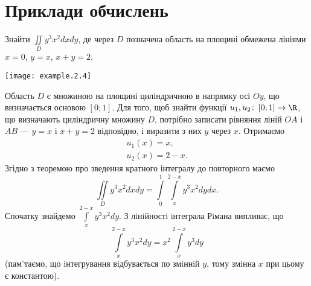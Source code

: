 \chapter{Приклади обчислень}
\begin{example}
Знайти ${\iint\limits_D y^3 x^2 d x d y}$, де через $D$ позначена область на площині обмежена лініями ${x = 0}$, ${y = x}$, ${x + y = 2}$.

\texttt{[image: example.2.4]}

Область $D$ є множиною на площині циліндричною в напрямку осі ${Oy}$, що визначається основою ${\left[0;1\right]}$. Для того, щоб знайти функції ${u_1, u_2\colon \left[0;1\right]\to \R}$, що визначають циліндричну множину $D$, потрібно записати рівняння ліній ${OA}$ і ${AB}$ --- ${y = x}$ і ${x + y =2 }$ відповідно, і виразити з них $y$ через $x$. Отримаємо
\[
\begin{array}{l}
u_1(x) = x,\\ u_2(x) = 2 - x.
\end{array}
\]
Згідно з теоремою про зведення кратного інтегралу до повторного маємо
\[
\iint\limits_D y^3 x^2 d x d y = \int\limits_0^1 \int\limits_{x}^{2 - x} y^3 x^2 d y d x.
\]
Спочатку знайдемо ${\int\limits_{x}^{2 - x} y^3 x^2 d y}$. З лiнiйностi iнтеграла Рiмана випливає, що
\[
\int\limits_{x}^{2 - x} y^3 x^2 d y = x^2 \int\limits_{x}^{2 - x} y^3  d y
\]
(пам’таємо, що iнтегрування вiдбувається по змiннiй $y$, тому змiнна $x$ при цьому є константою).


\end{example}

